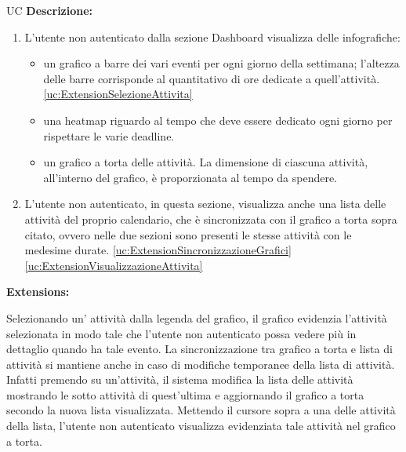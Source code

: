 \begin{listaPersonale}{UC}
    \textbf{Descrizione:}
    \begin{enumerate}
        \item L'utente non autenticato dalla sezione Dashboard visualizza delle infografiche:
              \begin{itemize}
                  \item un grafico a barre dei vari eventi per ogni giorno della settimana; l'altezza delle barre corrisponde al quantitativo di ore dedicate a quell'attività. \ref{uc:ExtensionSelezioneAttivita}
                  \item una heatmap riguardo al tempo che deve essere dedicato ogni giorno per rispettare le varie deadline.
                  \item un grafico a torta delle attività. La dimensione di ciascuna attività, all'interno del grafico, è proporzionata al tempo da spendere.
              \end{itemize}
        \item L'utente non autenticato, in questa sezione, visualizza anche una lista delle attività del proprio calendario, che è sincronizzata con il grafico a torta sopra citato, ovvero nelle due sezioni sono presenti le stesse attività con le medesime durate. \ref{uc:ExtensionSincronizzazioneGrafici} \ref{uc:ExtensionVisualizzazioneAttivita}
    \end{enumerate}

    \textbf{Extensions:}
    \begin{enumerate}[label=\textbf{[extension \arabic{enumii}]}, ref= \textbf{[extension \arabic{enumii}]}]
         Selezionando un' attività dalla legenda del grafico, il grafico evidenzia l'attività selezionata in modo tale che l'utente non autenticato possa vedere più in dettaglio quando ha tale evento.
         La sincronizzazione tra grafico a torta e lista di attività si mantiene anche in caso di modifiche temporanee della lista di attività. Infatti premendo su un'attività, il sistema modifica la lista delle attività mostrando le sotto attività di quest'ultima e aggiornando il grafico a torta secondo la nuova lista visualizzata.
         Mettendo il cursore sopra a una delle attività della lista, l'utente non autenticato visualizza evidenziata tale attività nel grafico a torta.
    \end{enumerate}





\end{listaPersonale}

